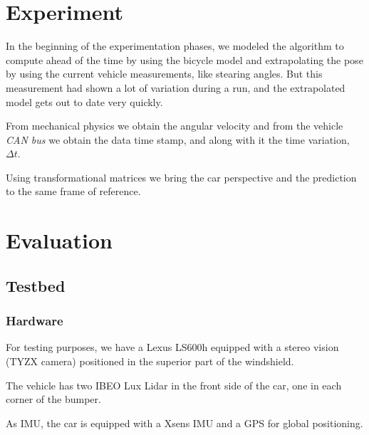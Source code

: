 \section{Experiment}

In the beginning of the experimentation phases, we modeled the algorithm to compute ahead of the time by using the bicycle model and extrapolating the pose by using the current vehicle measurements, like stearing angles. But this measurement had shown a lot of variation during a run, and the extrapolated model gets out to date very quickly.

From mechanical physics we obtain the angular velocity and from the vehicle \emph{CAN bus} we obtain the data time stamp, and along with it the time variation, $\Delta t$.

Using transformational matrices we bring the car perspective \cite{iyengar1991autonomous} and the prediction to the same frame of reference.

\section{Evaluation}


\subsection{Testbed}
\label{sec:testbed}

\subsubsection*{Hardware}

For testing purposes, we have a Lexus LS600h equipped with a stereo vision (TYZX camera) positioned in the superior part of the windshield.

The vehicle has two IBEO Lux Lidar in the front side of the car, one in each corner of the bumper.

As IMU, the car is equipped with a Xsens IMU and a GPS for global positioning.


